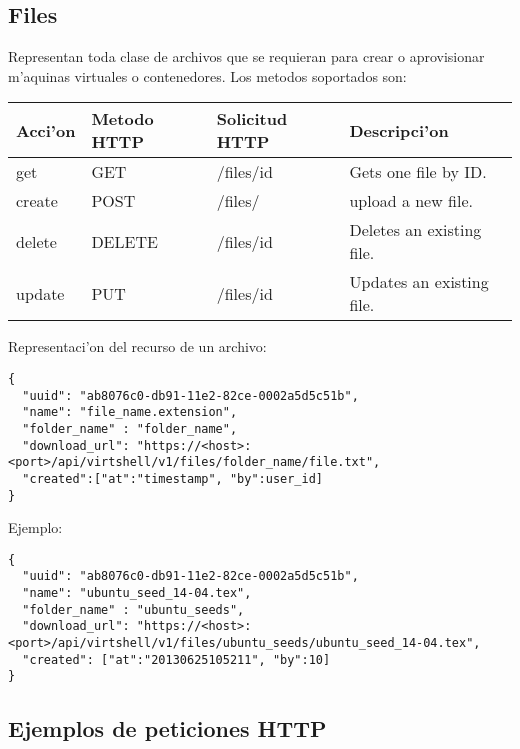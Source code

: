 \subsection{Files}
Representan toda clase de archivos que se requieran para crear o aprovisionar m'aquinas virtuales o contenedores. Los metodos soportados son:

\begin{center}
 \begin{tabular}{| l | l | l | l |}
 \hline
  \rowcolor{blueapi}
  \textbf{Acci'on} & \textbf{Metodo HTTP} & \textbf{Solicitud HTTP} & \textbf{Descripci'on} \\ [0.5ex] 
  \hline\hline
  get & GET & /files/id & Gets one file by ID. \\
  \hline
  create & POST & /files/ & upload a new file. \\
  \hline
  delete & DELETE & /files/id & Deletes an existing file. \\
  \hline  
  update & PUT & /files/id & Updates an existing file. \\ [1ex]  
  \hline
\end{tabular}
\end{center}

\vspace{1cm}
Representaci'on del recurso de un archivo:
\vspace{1cm}

\begin{lstlisting}[style=json]
{
  "uuid": "ab8076c0-db91-11e2-82ce-0002a5d5c51b",
  "name": "file_name.extension",
  "folder_name" : "folder_name",
  "download_url": "https://<host>:<port>/api/virtshell/v1/files/folder_name/file.txt",
  "created":["at":"timestamp", "by":user_id]
}
\end{lstlisting}

Ejemplo:

\medskip
\begin{lstlisting}[style=json]
{
  "uuid": "ab8076c0-db91-11e2-82ce-0002a5d5c51b",
  "name": "ubuntu_seed_14-04.tex",
  "folder_name" : "ubuntu_seeds",
  "download_url": "https://<host>:<port>/api/virtshell/v1/files/ubuntu_seeds/ubuntu_seed_14-04.tex",
  "created": ["at":"20130625105211", "by":10]
}
\end{lstlisting}

\subsection{Ejemplos de peticiones HTTP}


